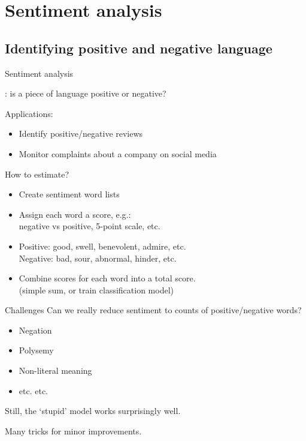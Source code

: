 \documentclass[aspectratio=169,usenames,dvipsnames]{beamer}
\begin{document}


\section{Sentiment analysis}
\subsection{Identifying positive and negative language}
\frame{\tableofcontents[currentsection]}

\begin{frame}{Sentiment analysis}
    \begin{definition}
        : 
            is a piece of language positive or negative?
    \end{definition}

    Applications:
    \begin{itemize}
        \item Identify positive/negative reviews
        \item Monitor complaints about a company on social media
    \end{itemize}

    \pause
    How to estimate?
    \begin{itemize}
        \item Create sentiment word lists
        \item Assign each word a score, e.g.: \\
            negative vs positive, 5-point scale, etc.
        \item Positive: good, swell, benevolent, admire, etc. \\
                Negative: bad, sour, abnormal, hinder, etc.
        \item Combine scores for each word into a total score. \\
                (simple sum, or train classification model)
    \end{itemize}
\end{frame}

\begin{frame}{Challenges}
    Can we really reduce sentiment to counts of positive/negative words?

    \begin{itemize}
        \item Negation
        \item Polysemy
        \item Non-literal meaning
        \item etc. etc.
    \end{itemize}

    Still, the `stupid' model works surprisingly well.

    Many tricks for minor improvements.
\end{frame}
\end{document}
